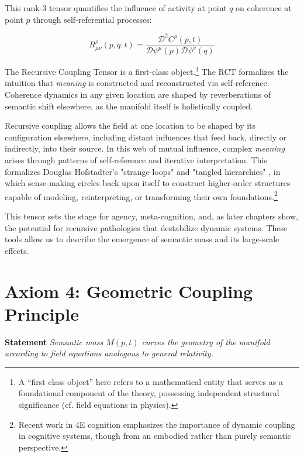 This rank-3 tensor quantifies the influence of activity at point \(q\) on coherence at point \(p\) through self-referential processes:

\begin{equation}
R^\rho_{\mu\nu}(p,q,t) = \frac{\mathcal{D}^2 C^\rho(p,t)}{\mathcal{D} \psi^\mu(p) \mathcal{D} \psi^\nu(q)}
\end{equation}

The Recursive Coupling Tensor is a first-class object.\footnote{A “first class object” here refers to a mathematical entity that serves as a foundational component of the theory, possessing independent structural significance (cf. field equations in physics).} The RCT formalizes the intuition that \textit{meaning} is constructed and reconstructed via self-reference. Coherence dynamics in any given location are shaped by reverberations of semantic shift elsewhere, as the manifold itself is holistically coupled.

Recursive coupling allows the field at one location to be shaped by its configuration elsewhere, including distant influences that feed back, directly or indirectly, into their source. In this web of mutual influence, complex \textit{meaning} arises through patterns of self-reference and iterative interpretation. This formalizes Douglas Hofstadter's "strange loops" and "tangled hierarchies" \autocite{Hofstadter1979, Hofstadter2007}, in which sense-making circles back upon itself to construct higher-order structures capable of modeling, reinterpreting, or transforming their own foundations.\footnote{Recent work in 4E cognition \autocite{Newen2018, Gallagher2020} emphasizes the importance of dynamic coupling in cognitive systems, though from an embodied rather than purely semantic perspective.}

This tensor sets the stage for agency, meta-cognition, and, as later chapters show, the potential for recursive pathologies that destabilize dynamic systems. These tools allow us to describe the emergence of semantic mass and its large-scale effects.


\section{Axiom 4: Geometric Coupling Principle}
\label{1.4:axiom_4_geometric_coupling_principle}

\textbf{Statement} \textit{Semantic mass \(M(p,t)\) curves the geometry of the manifold according to field equations analogous to general relativity.}


